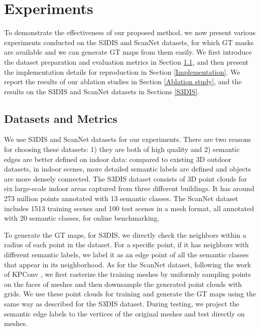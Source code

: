\documentclass[runningheads]{llncs}
\begin{document}
\section{Experiments}

To demonstrate the effectiveness of our proposed method, we now present various experiments conducted on the S3DIS \cite{armeni_cvpr16} and ScanNet\cite{dai2017scannet} datasets, for which GT {\SemSegPoint} masks are available and we can generate GT {\SemEdgePoint} maps from them easily.
{We first introduce the dataset preparation and evaluation metrics in Section \ref{Datasets}, and then present the implementation details for reproduction in Section \ref{Implementation}. We report the results of our ablation studies in Section \ref{Ablation study}, and the results on the S3DIS and ScanNet datasets in Sections \ref{S3DIS}.}


\subsection{Datasets and Metrics} \label{Datasets}


We use S3DIS \cite{armeni_cvpr16} and ScanNet \cite{dai2017scannet} datasets for our experiments. {There are two reasons for choosing these datasets: 1) they are both of high quality and 2) semantic edges are better defined on indoor data: compared to existing 3D outdoor datasets, in indoor scenes, more detailed semantic labels are defined and objects are more densely connected}.
The S3DIS dataset consists of 3D point clouds for six large-scale indoor areas captured from three different buildings. It has around 273 million points annotated with 13 semantic classes. The ScanNet dataset includes 1513 training scenes and 100 test scenes in a mesh format, all annotated with 20 semantic classes, for online benchmarking.

To generate the GT {\SemEdgePoint} maps, for S3DIS, we directly check the neighbors within a  radius of each point in the dataset. For a specific point, if it has neighbors
with different semantic labels, we label it as an edge point of all the semantic classes that appear in its neighborhood. As for the ScanNet dataset, following the work of KPConv \cite{thomas2019kpconv}, we first rasterize the training meshes by uniformly sampling points on the faces of meshes and then downsample the generated point clouds with  grids. {We use these point clouds for training and generate {the} GT {\SemEdgePoint} maps using the same way as described for the S3DIS dataset.}
During testing, we project the semantic edge labels to the vertices 
of the original meshes and test directly on meshes.
\end{document}
